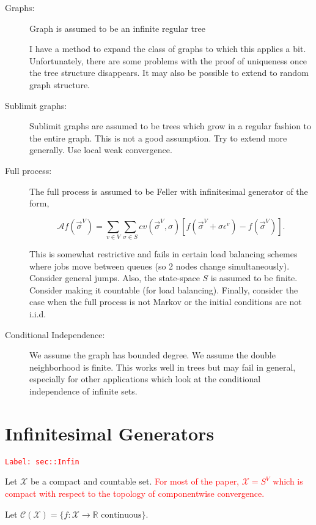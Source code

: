 \documentclass[12pt]{article}
\newcommand{\mb}{\mathbb}
\newcommand{\mc}{\mathcal}
\newcommand{\ra}{\rightarrow}
\newcommand{\te}{\text}
\newcommand{\ep}{\epsilon}
\newcommand{\tr}{\textcolor{red}}
\newcommand{\labe}[1]{\tr{\texttt{Label: #1}}}
\renewcommand{\v}{v}							%
\renewcommand{\S}{S}							%
\newcommand{\s}{\sigma}							%
\newcommand{\sv}{\vec{\s}}						%
\newcommand{\ev}{\ep}							%
\newcommand{\IG}{\mc{A}}						%
\newcommand{\IGr}{c}							%
\newcommand{\vind}[1]{^{#1}}					%
\newcommand{\carp}[1]{^{#1}}					%
\newcommand{\vsi}[1]{^{#1}}						%
\newcommand{\cind}[1]{_{#1}}					%
\newcommand{\cont}{\mc{C}}						%
\newcommand{\spce}{\mc{X}}						%
\begin{document}
\begin{description}
\item[Graphs: ] Graph is assumed to be an infinite regular tree

I have a method to expand the class of graphs to which this applies a bit. Unfortunately, there are some problems with the proof of uniqueness once the tree structure disappears. It may also be possible to extend to random graph structure.

\item[Sublimit graphs: ] Sublimit graphs are assumed to be trees which grow in a regular fashion to the entire graph. This is not a good assumption. Try to extend more generally. Use local weak convergence.

\item[Full process: ] The full process is assumed to be Feller with infinitesimal generator of the form,

\[\IG f(\sv\cind{}\vsi{V}) = \sum_{\v \in V}\sum_{\s \in \S} \IGr{\v}(\sv\cind{}\vsi{V},\s)[f(\sv\cind{}\vsi{V} + \s \ev\vind{\v}) - f(\sv\cind{}\vsi{V})].\]

This is somewhat restrictive and fails in certain load balancing schemes where jobs move between queues (so 2 nodes change simultaneously). Consider general jumps. Also, the state-space \(\S\) is assumed to be finite. Consider making it countable (for load balancing). Finally, consider the case when the full process is not Markov or the initial conditions are not i.i.d.

\item[Conditional Independence: ] We assume the graph has bounded degree. We assume the double neighborhood is finite. This works well in trees but may fail in general, especially for other applications which look at the conditional independence of infinite sets.
\end{description}

\newpage
\appendix

\section{Infinitesimal Generators}
\label{sec::Infin}\labe{sec::Infin}

Let \(\spce\) be a compact and countable set. \tr{For most of the paper, \(\spce = \S\carp{V}\) which is compact with respect to the topology of componentwise convergence.}

Let \(\cont(\spce)= \{f:\spce \ra \mb{R} \te{ continuous}\}\).
\end{document}
